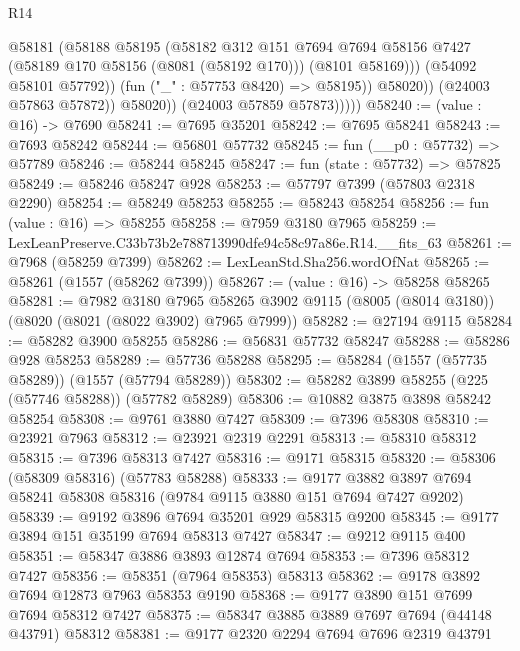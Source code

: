 \begin{lexlean}{R14}
\begin{coremodule}
                        @58181
                          (@58188
                            @58195
                            (@58182
                              @312
                              @151
                              @7694
                              @7694
                              @58156
                              @7427
                              (@58189 @170 @58156 (@8081 (@58192 @170)))
                              (@8101 @58169)))
                          (@54092 @58101 @57792))
                        (fun ("_" : @57753 @8420) => @58195))
                      @58020))
                  (@24003 @57863 @57872))
                @58020))
            (@24003 @57859 @57873)))))
@58240 := (value : @16) -> @7690
@58241 := @7695 @35201
@58242 := @7695 @58241
@58243 := @7693 @58242
@58244 := @56801 @57732
@58245 := fun (__p0 : @57732) => @57789
@58246 := @58244 @58245
@58247 := fun (state : @57732) => @57825
@58249 := @58246 @58247 @928
@58253 := @57797 @7399 (@57803 @2318 @2290)
@58254 := @58249 @58253
@58255 := @58243 @58254
@58256 := fun (value : @16) => @58255
@58258 := @7959 @3180 @7965
@58259 := LexLeanPreserve.C33b73b2e788713990dfe94c58c97a86e.R14.__fits_63
@58261 := @7968 (@58259 @7399)
@58262 := LexLeanStd.Sha256.wordOfNat
@58265 := @58261 (@1557 (@58262 @7399))
@58267 := (value : @16) -> @58258 @58265
@58281 := @7982
    @3180
    @7965
    @58265
    @3902
    @9115
    (@8005 (@8014 @3180))
    (@8020 (@8021 (@8022 @3902) @7965 @7999))
@58282 := @27194 @9115
@58284 := @58282 @3900 @58255
@58286 := @56831 @57732 @58247
@58288 := @58286 @928 @58253
@58289 := @57736 @58288
@58295 := @58284 (@1557 (@57735 @58289)) (@1557 (@57794 @58289))
@58302 := @58282 @3899 @58255 (@225 (@57746 @58288)) (@57782 @58289)
@58306 := @10882 @3875 @3898 @58242 @58254
@58308 := @9761 @3880 @7427
@58309 := @7396 @58308
@58310 := @23921 @7963
@58312 := @23921 @2319 @2291
@58313 := @58310 @58312
@58315 := @7396 @58313 @7427
@58316 := @9171 @58315
@58320 := @58306 (@58309 @58316) (@57783 @58288)
@58333 := @9177 @3882 @3897 @7694 @58241 @58308 @58316 (@9784 @9115 @3880 @151 @7694 @7427 @9202)
@58339 := @9192 @3896 @7694 @35201 @929 @58315 @9200
@58345 := @9177 @3894 @151 @35199 @7694 @58313 @7427
@58347 := @9212 @9115 @400
@58351 := @58347 @3886 @3893 @12874 @7694
@58353 := @7396 @58312 @7427
@58356 := @58351 (@7964 @58353) @58313
@58362 := @9178 @3892 @7694 @12873 @7963 @58353 @9190
@58368 := @9177 @3890 @151 @7699 @7694 @58312 @7427
@58375 := @58347 @3885 @3889 @7697 @7694 (@44148 @43791) @58312
@58381 := @9177 @2320 @2294 @7694 @7696 @2319 @43791

\end{coremodule}
\end{lexlean}
